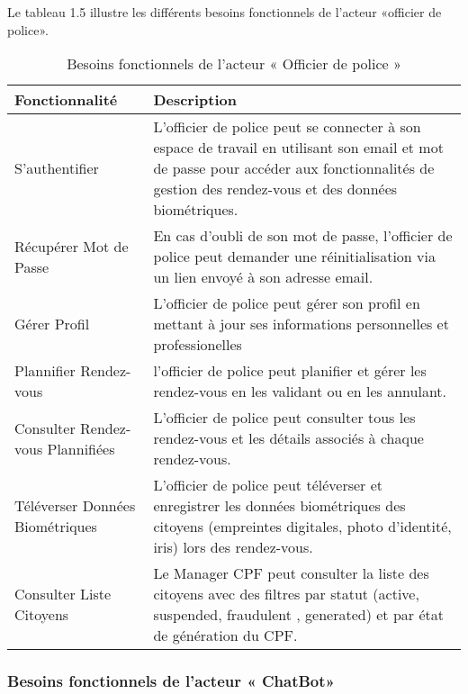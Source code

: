 Le tableau 1.5 illustre les différents besoins fonctionnels de l'acteur «officier de police».
\begin{table}[H]
\centering
\caption{\centering Besoins fonctionnels de l'acteur « Officier de police »}

\begin{tabular}
{| >{\centering\arraybackslash}p{4.2cm} | >{\centering\arraybackslash}p{12.5cm} |}
\rowcolor{gray!30}
\hline \textbf{Fonctionnalité} & \textbf{Description}\\
\hline
S'authentifier & L'officier de police peut se connecter à son espace de travail en utilisant son email et mot de passe pour accéder aux fonctionnalités de gestion des rendez-vous et des données biométriques. \\
\hline
Récupérer Mot de Passe & En cas d'oubli de son mot de passe, l'officier de police peut demander une réinitialisation via un lien envoyé à son adresse email.\\
\hline
Gérer Profil & L'officier de police peut gérer son profil en mettant à jour ses informations personnelles et professionelles\\
\hline
Plannifier Rendez-vous & l'officier de police peut planifier et gérer les rendez-vous en les validant ou en les annulant.\\
\hline
Consulter Rendez-vous Plannifiées & L'officier de police peut consulter tous les rendez-vous et les détails associés à chaque rendez-vous.\\
\hline
Téléverser Données Biométriques & L'officier de police peut téléverser et enregistrer les données biométriques des citoyens (empreintes digitales, photo d'identité, iris) lors des rendez-vous.\\
\hline
Consulter Liste Citoyens & Le Manager CPF peut consulter la liste des citoyens avec des filtres par statut (active, suspended, fraudulent , generated) et par état de génération du CPF. \\
\hline
\end{tabular}
\end{table}


\subsubsection{Besoins fonctionnels de l'acteur « ChatBot»}

